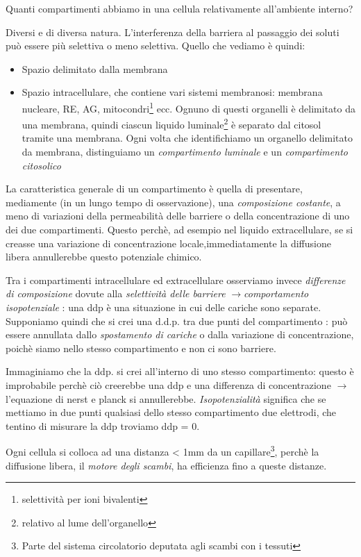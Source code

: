 \documentclass[a4paper,12pt]{article}
\newcommand{\lfreccia}{\ensuremath{\longrightarrow}}
\begin{document}
Quanti compartimenti abbiamo in una cellula relativamente all'ambiente interno? 

Diversi e di diversa natura. L'interferenza della barriera al passaggio dei soluti può essere più selettiva o meno selettiva.
Quello che vediamo è quindi:
\begin{itemize}
\item{Spazio delimitato dalla membrana}
\item{Spazio intracellulare, che contiene vari sistemi membranosi: membrana nucleare, RE, AG, mitocondri\footnote{selettività per ioni bivalenti} ecc. Ognuno di questi organelli è delimitato da una membrana, quindi ciascun liquido luminale\footnote{relativo al lume dell'organello} è separato dal citosol tramite una membrana. Ogni volta che identifichiamo un organello delimitato da membrana, distinguiamo un \emph{compartimento luminale} e un \emph{compartimento citosolico}}
\end{itemize}

La caratteristica generale di un compartimento è quella di presentare, mediamente (in un lungo tempo di osservazione), una \emph{composizione costante}, a meno di variazioni della permeabilità delle barriere o della concentrazione di uno dei due compartimenti. Questo perchè, ad esempio nel liquido extracellulare, se si creasse una variazione di concentrazione locale,immediatamente la diffusione libera  annullerebbe questo potenziale chimico.

Tra i compartimenti intracellulare ed extracellulare osserviamo invece \emph{differenze di composizione} dovute alla \emph{selettività delle barriere} \lfreccia \emph{comportamento isopotenziale} : una ddp è una situazione in cui delle cariche sono separate. Supponiamo quindi che si crei una d.d.p. tra due punti del compartimento : può essere annullata dallo \emph{spostamento di cariche} o dalla variazione di concentrazione, poichè siamo nello stesso compartimento e non ci sono barriere.

Immaginiamo che la ddp. si crei all'interno di uno stesso compartimento: questo è improbabile perchè ciò creerebbe una ddp e una differenza di concentrazione \lfreccia l'equazione di nerst e planck si annullerebbe.
\emph{Isopotenzialità} significa che se mettiamo in due punti qualsiasi dello stesso compartimento due elettrodi, che tentino di misurare la ddp troviamo ddp = 0.


Ogni cellula si colloca ad una distanza < 1mm da un capillare\footnote{Parte del sistema circolatorio deputata agli scambi con i tessuti}, perchè la diffusione libera, il \emph{motore degli scambi}, ha efficienza fino a queste distanze.
\end{document}
